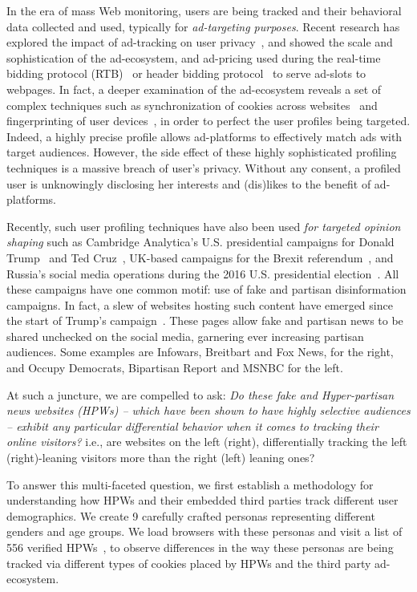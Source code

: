 \documentclass{article}
\newcommand{\hpws}{HPWs\xspace}
\newcommand{\visitedSites}{556\xspace}
\begin{document}
In the era of mass Web monitoring, users are being tracked and their behavioral data collected and used, typically for \emph{ad-targeting purposes}.
Recent research has explored the impact of ad-tracking on user privacy~\cite{costOfAds,panpap_www2019}, and showed the scale and sophistication of the ad-ecosystem, and ad-pricing used during the real-time bidding protocol (RTB)~\cite{papadopoulos2017if} or header bidding protocol~\cite{pachilakis2019headerbidding} to serve ad-slots to webpages.
In fact, a deeper examination of the ad-ecosystem reveals a set of complex techniques such as synchronization of cookies across websites~\cite{panpap_www2019,castelluccia2014selling,acar2014web} and fingerprinting of user devices~\cite{Nikiforakis:2013:CME:2497621.2498133,devFingerprinting}, in order to perfect the user profiles being targeted.
Indeed, a highly precise profile allows ad-platforms to effectively match ads with target audiences.
However, the side effect of these highly sophisticated profiling techniques is a massive breach of user's privacy.
Without any consent, a profiled user is unknowingly disclosing her interests and (dis)likes to the benefit of ad-platforms.

Recently, such user profiling techniques have also been used \emph{for targeted opinion shaping} such as Cambridge Analytica's U.S. presidential campaigns for Donald Trump~\cite{CATrump} and Ted Cruz~\cite{CACruz}, UK-based campaigns for the Brexit referendum~\cite{CABrexit}, and Russia's social media operations during the 2016 U.S. presidential election~\cite{RussiaFB}. 
All these campaigns have one common motif: use of fake and partisan disinformation campaigns.
In fact, a slew of websites hosting such content have emerged since the start of Trump's campaign~\cite{bhatt2018illuminating}.
These pages allow fake and partisan news to be shared unchecked on the social media, garnering ever increasing partisan audiences. Some examples are Infowars, Breitbart and Fox News, for the right, and Occupy Democrats, Bipartisan Report and MSNBC for the left.

At such a juncture, we are compelled to ask: \emph{Do these fake and Hyper-partisan news websites (\hpws) -- which have been shown to have highly selective audiences -- exhibit any particular differential behavior when it comes to tracking their online visitors?}
i.e., are websites on the left (right), differentially tracking the left (right)-leaning visitors more than the right (left) leaning ones?

To answer this multi-faceted question, we first establish a methodology for understanding how \hpws and their embedded third parties track different user demographics.
We create 9 carefully crafted personas representing different genders and age groups.
We load browsers with these personas and visit a list of \visitedSites verified \hpws~\cite{bhatt2018illuminating}, to observe differences in the way these personas are being tracked via different types of cookies placed by \hpws and the third party ad-ecosystem.
\end{document}

